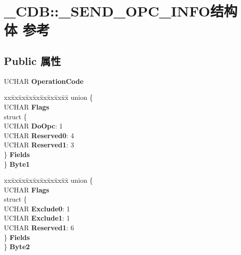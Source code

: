 \hypertarget{struct___c_d_b_1_1___s_e_n_d___o_p_c___i_n_f_o}{}\section{\+\_\+\+C\+DB\+:\+:\+\_\+\+S\+E\+N\+D\+\_\+\+O\+P\+C\+\_\+\+I\+N\+F\+O结构体 参考}
\label{struct___c_d_b_1_1___s_e_n_d___o_p_c___i_n_f_o}
\subsection*{Public 属性}
\begin{DoxyCompactItemize}
\item 
\mbox{\label{struct___c_d_b_1_1___s_e_n_d___o_p_c___i_n_f_o_a3b96e7a0047b6a568d4f7235ada48985}} 
U\+C\+H\+AR {\bfseries Operation\+Code}
\item 
\mbox{\label{struct___c_d_b_1_1___s_e_n_d___o_p_c___i_n_f_o_a6c0a704e33f6fa06d43a0b74edfcf949}} 
\begin{tabbing}
xx\=xx\=xx\=xx\=xx\=xx\=xx\=xx\=xx\=\kill
union \{\\
\>UCHAR {\bfseries Flags}\\
\>struct \{\\
\>\>UCHAR {\bfseries DoOpc}: 1\\
\>\>UCHAR {\bfseries Reserved0}: 4\\
\>\>UCHAR {\bfseries Reserved1}: 3\\
\>\} {\bfseries Fields}\\
\} {\bfseries Byte1}\\

\end{tabbing}\item 
\mbox{\label{struct___c_d_b_1_1___s_e_n_d___o_p_c___i_n_f_o_a05d28c750a8ee58d8df5c938a84d6633}} 
\begin{tabbing}
xx\=xx\=xx\=xx\=xx\=xx\=xx\=xx\=xx\=\kill
union \{\\
\>UCHAR {\bfseries Flags}\\
\>struct \{\\
\>\>UCHAR {\bfseries Exclude0}: 1\\
\>\>UCHAR {\bfseries Exclude1}: 1\\
\>\>UCHAR {\bfseries Reserved1}: 6\\
\>\} {\bfseries Fields}\\
\} {\bfseries Byte2}\\


\end{tabbing}
\end{DoxyCompactItemize}
